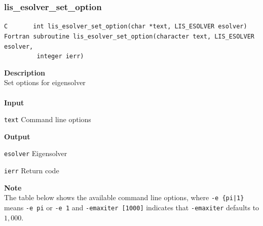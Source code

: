 \documentclass[a4paper]{article}
\newcommand{\namelistlabel}[1]{\mbox{#1}\hfill}
\newenvironment{namelist}[1]{%
 \begin{list}{}
  {\let\makelabel\namelistlabel
  \settowidth{\labelwidth}{#1}
  \setlength{\leftmargin}{1.1\labelwidth}}
}{%
\end{list}}
\begin{document}
  \subsubsection{lis\_esolver\_set\_option}
  \label{sec:setoptions}
\begin{screen}
\verb|C       int lis_esolver_set_option(char *text, LIS_ESOLVER esolver)|
\verb|Fortran subroutine lis_esolver_set_option(character text, LIS_ESOLVER esolver,|\\
\verb|         integer ierr)|
\end{screen}
{\bf Description}\\
\indent
Set options for eigensolver
\\ \\
\noindent
{\bf Input}
\begin{namelist}{XXXXXXXXXXXXXXXXXXXX}
\item[\tt text] Command line options
\end{namelist}
{\bf Output}
\begin{namelist}{XXXXXXXXXXXXXXXXXXXX}
\item[\tt esolver] Eigensolver
\item[\tt ierr] Return code
\end{namelist}
{\bf Note}\\
\indent
The table below shows the available command line options, 
where \verb=-e {pi|1}= means \verb=-e pi= or \verb=-e 1= and \verb=-emaxiter [1000]= indicates 
that \verb=-emaxiter= defaults to $1,000$.
\\
\\
\end{document}
